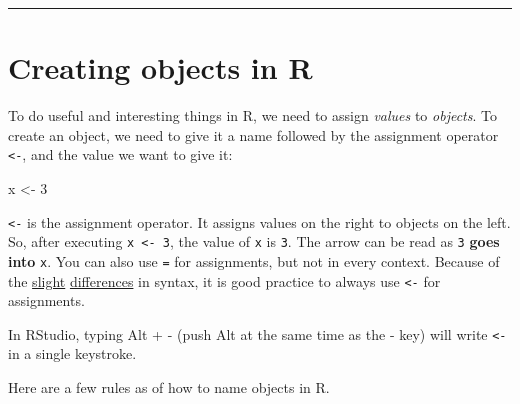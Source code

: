 \documentclass[
]{book}
\newenvironment{Shaded}{\begin{snugshade}}{\end{snugshade}}
\newcommand{\DecValTok}[1]{\textcolor[rgb]{0.00,0.00,0.81}{#1}}
\newcommand{\NormalTok}[1]{#1}
\newcommand{\OtherTok}[1]{\textcolor[rgb]{0.56,0.35,0.01}{#1}}
\begin{document}
\begin{center}\rule{0.5\linewidth}{0.5pt}\end{center}

\hypertarget{creating-objects-in-r}{%
\section{Creating objects in R}\label{creating-objects-in-r}}

To do useful and interesting things in R, we need to assign \emph{values} to
\emph{objects}. To create an object, we need to give it a name followed by the
assignment operator \texttt{\textless{}-}, and the value we want to give it:

\begin{Shaded}
\begin{Highlighting}[]
\NormalTok{ x }\OtherTok{\textless{}{-}} \DecValTok{3}
\end{Highlighting}
\end{Shaded}

\texttt{\textless{}-} is the assignment operator. It assigns values on the right to objects on
the left. So, after executing \texttt{x\ \textless{}-\ 3}, the value of \texttt{x} is \texttt{3}. The arrow can
be read as \texttt{3} \textbf{goes into} \texttt{x}. You can also use \texttt{=}
for assignments, but not in every context. Because of
the
\href{http://blog.revolutionanalytics.com/2008/12/use-equals-or-arrow-for-assignment.html}{slight} \href{https://web.archive.org/web/20130610005305/https://stat.ethz.ch/pipermail/r-help/2009-March/191462.html}{differences} in
syntax, it is good practice to always use \texttt{\textless{}-} for assignments.

In RStudio, typing Alt + - (push Alt at the
same time as the - key) will write \texttt{\textless{}-} in a single keystroke.

Here are a few rules as of how to name objects in R.
\end{document}
